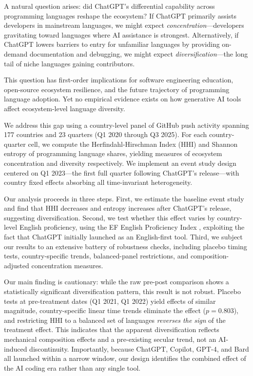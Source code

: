 \documentclass[12pt]{article}
\begin{document}
A natural question arises: did ChatGPT's differential capability across programming languages reshape the ecosystem? If ChatGPT primarily assists developers in mainstream languages, we might expect \textit{concentration}---developers gravitating toward languages where AI assistance is strongest. Alternatively, if ChatGPT lowers barriers to entry for unfamiliar languages by providing on-demand documentation and debugging, we might expect \textit{diversification}---the long tail of niche languages gaining contributors.

This question has first-order implications for software engineering education, open-source ecosystem resilience, and the future trajectory of programming language adoption. Yet no empirical evidence exists on how generative AI tools affect ecosystem-level language diversity.

We address this gap using a country-level panel of GitHub push activity spanning 177 countries and 23 quarters (Q1 2020 through Q3 2025). For each country-quarter cell, we compute the Herfindahl-Hirschman Index (HHI) and Shannon entropy of programming language shares, yielding measures of ecosystem concentration and diversity respectively. We implement an event study design centered on Q1 2023---the first full quarter following ChatGPT's release---with country fixed effects absorbing all time-invariant heterogeneity.

Our analysis proceeds in three steps. First, we estimate the baseline event study and find that HHI decreases and entropy increases after ChatGPT's release, suggesting diversification. Second, we test whether this effect varies by country-level English proficiency, using the EF English Proficiency Index \citep{efset2025epi}, exploiting the fact that ChatGPT initially launched as an English-first tool. Third, we subject our results to an extensive battery of robustness checks, including placebo timing tests, country-specific trends, balanced-panel restrictions, and composition-adjusted concentration measures.

Our main finding is cautionary: while the raw pre-post comparison shows a statistically significant diversification pattern, this result is not robust. Placebo tests at pre-treatment dates (Q1 2021, Q1 2022) yield effects of similar magnitude, country-specific linear time trends eliminate the effect ($p = 0.803$), and restricting HHI to a balanced set of languages \textit{reverses the sign} of the treatment effect. This indicates that the apparent diversification reflects mechanical composition effects and a pre-existing secular trend, not an AI-induced discontinuity. Importantly, because ChatGPT, Copilot, GPT-4, and Bard all launched within a narrow window, our design identifies the combined effect of the AI coding era rather than any single tool.
\end{document}
